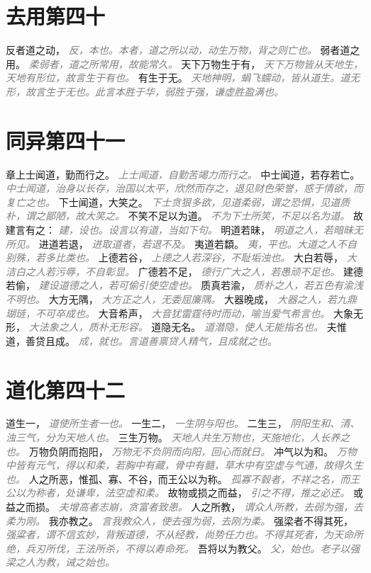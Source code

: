 \documentclass[a4paper,zihao=-4,oneside,landscape,UTF8]{ctexart}
\newcommand{\zhushi}[1]{\scriptsize{\textit{\textcolor{gray}{#1}}}\normalsize}
\begin{document}
\section{去用第四十}

反者道之动，
\zhushi{反，本也。本者，道之所以动，动生万物，背之则亡也。}
弱者道之用。
\zhushi{柔弱者，道之所常用，故能常久。}
天下万物生于有，
\zhushi{天下万物皆从天地生，天地有形位，故言生于有也。}
有生于无。
\zhushi{天地神明，蜎飞蠕动，皆从道生。道无形，故言生于无也。此言本胜于华，弱胜于强，谦虚胜盈满也。}


\section{同异第四十一}

章上士闻道，勤而行之。
\zhushi{上士闻道，自勤苦竭力而行之。}
中士闻道，若存若亡。
\zhushi{中士闻道，治身以长存，治国以太平，欣然而存之，退见财色荣誉，惑于情欲，而复亡之也。}
下士闻道，大笑之。
\zhushi{下士贪狠多欲，见道柔弱，谓之恐惧，见道质朴，谓之鄙陋，故大笑之。}
不笑不足以为道。
\zhushi{不为下士所笑，不足以名为道。}
故建言有之：
\zhushi{建，设也。设言以有道，当如下句。}
明道若昧，
\zhushi{明道之人，若暗昧无所见。}
进道若退，
\zhushi{进取道者，若退不及。}
夷道若纇。
\zhushi{夷，平也。大道之人不自别殊，若多比类也。}
上德若谷，
\zhushi{上德之人若深谷，不耻垢浊也。}
大白若辱，
\zhushi{大洁白之人若污辱，不自彰显。}
广德若不足，
\zhushi{德行广大之人，若愚顽不足也。}
建德若偷，
\zhushi{建设道德之人，若可偷引使空虚也。}
质真若渝，
\zhushi{质朴之人，若五色有渝浅不明也。}
大方无隅，
\zhushi{大方正之人，无委屈廉隅。}
大器晚成，
\zhushi{大器之人，若九鼎瑚琏，不可卒成也。}
大音希声，
\zhushi{大音犹雷霆待时而动，喻当爱气希言也。}
大象无形，
\zhushi{大法象之人，质朴无形容。}
道隐无名。
\zhushi{道潜隐，使人无能指名也。}
夫惟道，善贷且成。
\zhushi{成，就也。言道善禀贷人精气，且成就之也。}


\section{道化第四十二}

道生一，
\zhushi{道使所生者一也。}
一生二，
\zhushi{一生阴与阳也。}
二生三，
\zhushi{阴阳生和、清、浊三气，分为天地人也。}
三生万物。
\zhushi{天地人共生万物也，天施地化，人长养之也。}
万物负阴而抱阳，
\zhushi{万物无不负阴而向阳，回心而就日。}
冲气以为和。
\zhushi{万物中皆有元气，得以和柔，若胸中有藏，骨中有髓，草木中有空虚与气通，故得久生也。}
人之所恶，惟孤、寡、不谷，而王公以为称。
\zhushi{孤寡不毂者，不祥之名，而王公以为称者，处谦卑，法空虚和柔。}
故物或损之而益，
\zhushi{引之不得，推之必还。}
或益之而损。
\zhushi{夫增高者志崩，贪富者致患。}
人之所教，
\zhushi{谓众人所教，去弱为强，去柔为刚。}
我亦教之。
\zhushi{言我教众人，使去强为弱，去刚为柔。}
强梁者不得其死，
\zhushi{强粱者，谓不信玄妙，背叛道德，不从经教，尚势任力也。不得其死者，为天命所绝，兵刃所伐，王法所杀，不得以寿命死。}
吾将以为教父。
\zhushi{父，始也。老子以强梁之人为教，诫之始也。}
\end{document}
